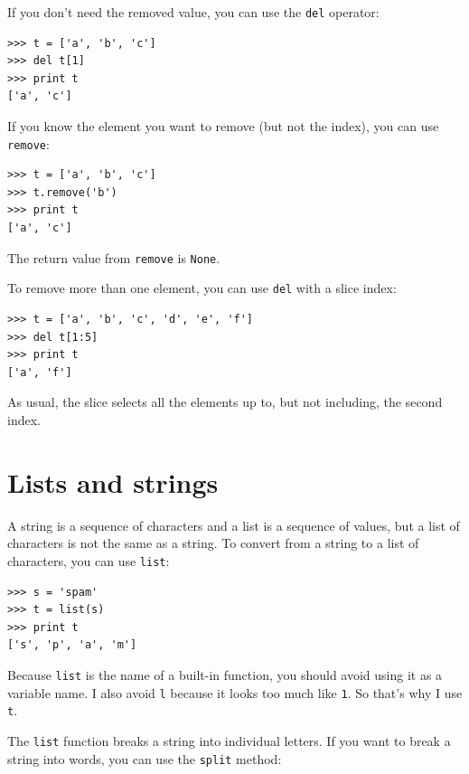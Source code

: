 \documentclass[10pt]{book}
\begin{document}
If you don't need the removed value, you can use the {\tt del}
operator:


\beforeverb
\begin{verbatim}
>>> t = ['a', 'b', 'c']
>>> del t[1]
>>> print t
['a', 'c']
\end{verbatim}
\afterverb
%

If you know the element you want to remove (but not the index), you
can use {\tt remove}:


\beforeverb
\begin{verbatim}
>>> t = ['a', 'b', 'c']
>>> t.remove('b')
>>> print t
['a', 'c']
\end{verbatim}
\afterverb
%
The return value from {\tt remove} is {\tt None}.


To remove more than one element, you can use {\tt del} with
a slice index:

\beforeverb
\begin{verbatim}
>>> t = ['a', 'b', 'c', 'd', 'e', 'f']
>>> del t[1:5]
>>> print t
['a', 'f']
\end{verbatim}
\afterverb
%
As usual, the slice selects all the elements up to, but not
including, the second index.


\section{Lists and strings}


A string is a sequence of characters and a list is a sequence
of values, but a list of characters is not the same as a
string.  To convert from a string to a list of characters,
you can use {\tt list}:


\beforeverb
\begin{verbatim}
>>> s = 'spam'
>>> t = list(s)
>>> print t
['s', 'p', 'a', 'm']
\end{verbatim}
\afterverb
%
Because {\tt list} is the name of a built-in function, you should
avoid using it as a variable name.  I also avoid {\tt l} because
it looks too much like {\tt 1}.  So that's why I use {\tt t}.

The {\tt list} function breaks a string into individual letters.  If
you want to break a string into words, you can use the {\tt split}
method:
\end{document}
